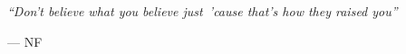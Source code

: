 \begin{titlepage}
    \nonumber
    \null {} %

    \setlength{\epigraphrule}{0pt}
    \setlength{\epigraphwidth}{0.42\textwidth}
    \renewcommand{\epigraphflush}{flushright}

    \epigraph{\emph{``Don't believe what you believe just~'cause that's how they raised you''}}{--- NF}

\end{titlepage}
